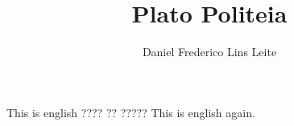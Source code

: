 \documentclass[10pt,a4paper]{book}
\author{Daniel Frederico Lins Leite}
\title{Plato Politeia}
\begin{document}
	
This is english
\textgreek{???? ?? ?????}
This is english again.
\end{document}
